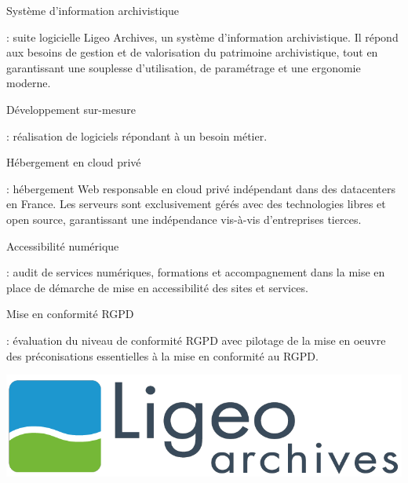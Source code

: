\documentclass[12pt, a4paper, twoside]{article}
\begin{document}
\noindent%
\begin{minipage}{.7\textwidth}%

\begin{hilite}Système d'information archivistique\end{hilite}: suite logicielle Ligeo Archives, un système d'information archivistique. 
Il répond aux besoins de gestion et de valorisation du patrimoine archivistique, tout en garantissant une souplesse d'utilisation, de paramétrage et une ergonomie moderne.

\begin{hilite}Développement sur-mesure\end{hilite}: réalisation de logiciels répondant à un besoin métier.

\begin{hilite}Hébergement en cloud privé\end{hilite}: hébergement Web responsable en \gls{cloud privé} indépendant dans des datacenters en France. 
Les serveurs sont exclusivement gérés avec des technologies libres et open source, garantissant une indépendance vis-à-vis d'entreprises tierces.

\begin{hilite}Accessibilité numérique\end{hilite}: audit de services numériques, formations et accompagnement dans la mise en place de démarche de mise en accessibilité des sites et services.

\begin{hilite}Mise en conformité \gls{RGPD}\end{hilite}: évaluation du niveau de conformité \gls{RGPD} avec pilotage de la mise en oeuvre des préconisations essentielles à la mise en conformité au \gls{RGPD}.

\end{minipage}%
\hfill
\begin{minipage}{.3\textwidth}%
\begin{center}
    \includegraphics[scale=0.2]{src/logo_ligeo.png}
\end{center}
\end{minipage}%
\end{document}

